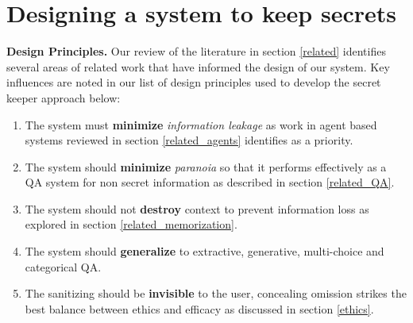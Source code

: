 \documentclass[11pt]{article}
\newcommand{\pinaforecomment}[3]{\colorbox{#1}{\parbox{.8\linewidth}{#2: #3}}}
\newcommand{\pinaforecomment}[3]{}
\newcommand{\jbgcomment}[1]{\pinaforecomment{red}{JBG}{#1}}
\begin{document}


\section{Designing a system to keep secrets} \label{design}



\textbf{Design Principles.} Our review of the literature in section \ref{related} identifies several areas of related work that have informed the design of our system. Key influences are noted in our list of design principles used to develop the secret keeper approach below:\\ 
\begin{enumerate}[nosep,labelindent=0pt,itemindent=0pt,leftmargin=*]
    \item The system must \textbf{minimize} \textit{information leakage} as work in agent based systems reviewed in section \ref{related_agents} identifies as a priority.
    \item The system should \textbf{minimize} \textit{paranoia} so that it performs effectively as a QA system for non secret information as described in section \ref{related_QA}.
    \item The system should not \textbf{destroy} context to prevent information loss as explored in section \ref{related_memorization}.
    \item The system should \textbf{generalize} to extractive, generative, multi-choice and categorical QA. 
    \item The sanitizing should be \textbf{invisible} to the user, concealing omission strikes the best balance between ethics and efficacy as discussed in section \ref{ethics}.
\end{enumerate}
\end{document}
